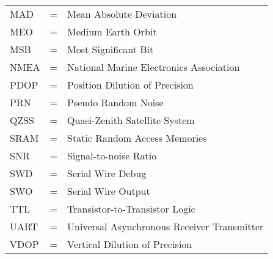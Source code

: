 \begin{tabular}{llp{3in}}
	MAD &  \hspace{1.5cm} = & Mean Absolute Deviation \\
	MEO &  \hspace{1.5cm} = & Medium Earth Orbit\\
	MSB &  \hspace{1.5cm} = & Most Significant Bit \\
	NMEA &  \hspace{1.5cm} = & National Marine Electronics Association\\
	PDOP &  \hspace{1.5cm} = & Position Dilution of Precision \\
	PRN &  \hspace{1.5cm} = & Pseudo Random Noise\\
	QZSS &  \hspace{1.5cm} = & Quasi-Zenith Satellite System\\
	SRAM &  \hspace{1.5cm} = & Static Random Access Memories \\
	SNR &  \hspace{1.5cm} = & Signal-to-noise Ratio\\
	SWD &  \hspace{1.5cm} = & Serial Wire Debug \\
	SWO &  \hspace{1.5cm} = & Serial Wire Output \\
	TTL &  \hspace{1.5cm} = & Transistor-to-Transistor Logic\\
	UART &  \hspace{1.5cm} = & Universal Asynchronous Receiver Transmitter \\
	VDOP &  \hspace{1.5cm} = & Vertical Dilution of Precision \\
\end{tabular}
